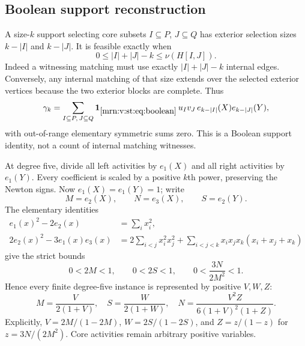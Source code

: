 \documentclass[11pt,a4paper]{article}
\theoremstyle{remark}\newtheorem{remark}[theorem]{Remark}
\begin{document}
\subsection{Boolean support reconstruction}\label{mrn:v:st:sec:boolean}
A size-$k$ support selecting core subsets $I\subseteq P$, $J\subseteq Q$
has exterior selection sizes $k-|I|$ and $k-|J|$. It is feasible exactly when
\begin{equation}\label{mrn:v:st:eq:boolean}
 0\le |I|+|J|-k\le\nu(H[I,J]).
\end{equation}
Indeed a witnessing matching must use exactly $|I|+|J|-k$ internal edges.
Conversely, any internal matching of that size extends over the selected
exterior vertices because the two exterior blocks are complete. Thus
\begin{equation}\label{mrn:v:st:eq:coeff}
 \gamma_k=\sum_{I\subseteq P,\,J\subseteq Q}
 \mathbf1_{\eqref{mrn:v:st:eq:boolean}}\,u_Iv_J\,
 e_{k-|I|}(X)e_{k-|J|}(Y),
\end{equation}
with out-of-range elementary symmetric sums zero. This is a Boolean
support identity, not a count of internal matching witnesses.

At degree five, divide all left activities by $e_1(X)$ and all right
activities by $e_1(Y)$. Every coefficient is scaled by a positive $k$th
power, preserving the Newton signs. Now $e_1(X)=e_1(Y)=1$; write
\[
 M=e_2(X),\qquad N=e_3(X),\qquad S=e_2(Y).
\]
The elementary identities
\begin{align}
 e_1(x)^2-2e_2(x)&=\sum_i x_i^2,\nonumber\\
 2e_2(x)^2-3e_1(x)e_3(x)
 &=2\sum_{i<j}x_i^2x_j^2+
   \sum_{i<j<k}x_ix_jx_k(x_i+x_j+x_k)\label{mrn:v:st:eq:moment}
\end{align}
give the strict bounds
\begin{equation}\label{mrn:v:st:eq:strictdomain}
 0<2M<1,\qquad 0<2S<1,\qquad 0<\frac{3N}{2M^2}<1.
\end{equation}
Hence every finite degree-five instance is represented by positive $V,W,Z$:
\begin{equation}\label{mrn:v:st:eq:substitution}
 M=\frac{V}{2(1+V)},\quad S=\frac{W}{2(1+W)},\quad
 N=\frac{V^2Z}{6(1+V)^2(1+Z)}.
\end{equation}
Explicitly, $V=2M/(1-2M)$, $W=2S/(1-2S)$, and $Z=z/(1-z)$ for
$z=3N/(2M^2)$. Core activities remain arbitrary positive variables.
\end{document}
